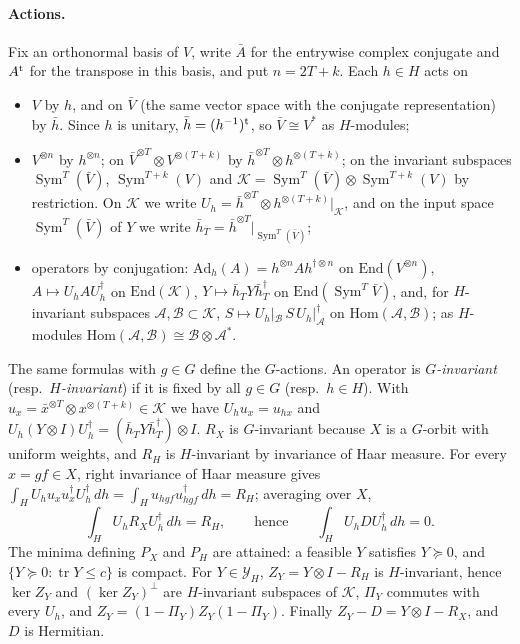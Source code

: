 \documentclass[11pt]{article}
\newcommand{\tr}{\operatorname{tr}}
\newcommand{\Sym}{\operatorname{Sym}}
\theoremstyle{definition}
\theoremstyle{remark}
\begin{document}
\paragraph{Actions.} Fix an orthonormal basis of $V$, write $\bar A$ for the entrywise complex conjugate and $A^{\rm t}$ for the transpose in
this basis, and put $n=2T+k$. Each $h\in H$ acts on
\begin{itemize}
\item[(A1)] $V$ by $h$, and on $\bar V$ (the same vector space with the conjugate representation) by $\bar h$. Since $h$ is unitary,
$\bar h=(h^{-1})^{\rm t}$, so $\bar V\cong V^\ast$ as $H$-modules;
\item[(A2)] $V^{\otimes n}$ by $h^{\otimes n}$; on $\bar V^{\otimes T}\otimes V^{\otimes(T+k)}$ by $\bar h^{\otimes T}\otimes h^{\otimes(T+k)}$; on the invariant
subspaces $\Sym^T(\bar V)$, $\Sym^{T+k}(V)$ and $\mathcal K=\Sym^T(\bar V)\otimes\Sym^{T+k}(V)$ by restriction. On $\mathcal K$ we write
$U_h=\bar h^{\otimes T}\otimes h^{\otimes(T+k)}|_{\mathcal K}$, and on the input space $\Sym^T(\bar V)$ of $Y$ we write $\bar h_T=\bar h^{\otimes T}|_{\Sym^T(\bar V)}$;
\item[(A3)] operators by conjugation: $\mathrm{Ad}_h(A)=h^{\otimes n}Ah^{\dagger\otimes n}$ on $\mathrm{End}(V^{\otimes n})$, $A\mapsto U_hAU_h^\dagger$ on
$\mathrm{End}(\mathcal K)$, $Y\mapsto\bar h_TY\bar h_T^\dagger$ on $\mathrm{End}(\Sym^T\bar V)$, and, for $H$-invariant subspaces $\mathcal A,\mathcal B\subset\mathcal K$,
$S\mapsto U_h|_{\mathcal B}\,S\,U_h|_{\mathcal A}^\dagger$ on $\mathrm{Hom}(\mathcal A,\mathcal B)$; as $H$-modules $\mathrm{Hom}(\mathcal A,\mathcal B)\cong\mathcal B\otimes\mathcal A^\ast$.
\end{itemize}
The same formulas with $g\in G$ define the $G$-actions. An operator is \emph{$G$-invariant} (resp.\ \emph{$H$-invariant}) if it is fixed by all
$g\in G$ (resp.\ $h\in H$). With $u_x=\bar x^{\otimes T}\otimes x^{\otimes(T+k)}\in\mathcal K$ we have $U_hu_x=u_{hx}$ and
$U_h(Y\otimes I)U_h^\dagger=(\bar h_TY\bar h_T^\dagger)\otimes I$. $R_X$ is $G$-invariant because $X$ is a $G$-orbit with uniform weights, and $R_H$ is
$H$-invariant by invariance of Haar measure. For every $x=gf\in X$, right invariance of Haar measure gives
$\int_HU_hu_xu_x^\dagger U_h^\dagger\,dh=\int_Hu_{hgf}u_{hgf}^\dagger\,dh=R_H$; averaging over $X$,
\begin{equation}\label{eq:W-twirl}
\int_HU_hR_XU_h^\dagger\,dh=R_H,\qquad\text{hence}\qquad\int_HU_hDU_h^\dagger\,dh=0 .
\end{equation}
The minima defining $P_X$ and $P_H$ are attained: a feasible $Y$ satisfies $Y\succeq0$, and $\{Y\succeq0:\tr Y\le c\}$ is compact.
For $Y\in\mathcal Y_H$, $Z_Y=Y\otimes I-R_H$ is $H$-invariant, hence $\ker Z_Y$ and $(\ker Z_Y)^\perp$ are $H$-invariant subspaces of $\mathcal K$,
$\Pi_Y$ commutes with every $U_h$, and $Z_Y=(1-\Pi_Y)Z_Y(1-\Pi_Y)$. Finally $Z_Y-D=Y\otimes I-R_X$, and $D$ is Hermitian.
\end{document}
